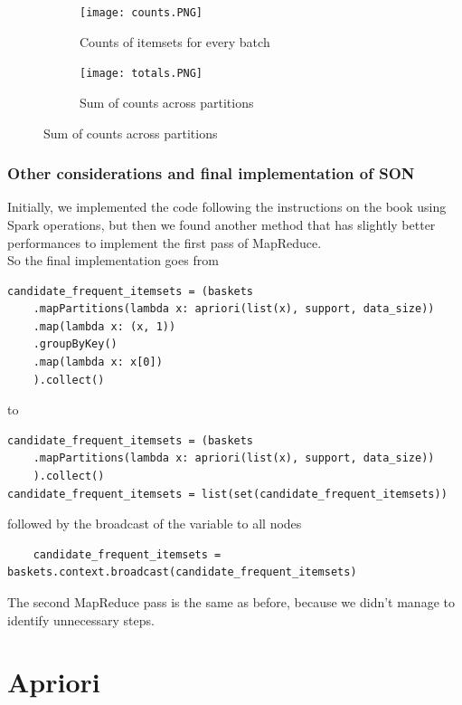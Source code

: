 \documentclass[a4paper]{article}
\begin{document}
	\begin{figure}[h]
		\centering
		
		\begin{subfigure}[b]{0.4\textwidth}
			\centering
			\texttt{[image: counts.PNG]}
         	\caption{Counts of itemsets for every batch}
         	\label{fig:counts}
		\end{subfigure}
		\hfill
		\begin{subfigure}[b]{0.4\textwidth}
			\centering
			\texttt{[image: totals.PNG]}
         	\caption{Sum of counts across partitions}
         	\label{fig:totals}
		\end{subfigure}
	\end{figure}
	
	
	\subsubsection{Other considerations and final implementation of SON}
	Initially, we implemented the code following the instructions on the book using Spark operations, but then we found another method that has slightly better performances to implement the first
	pass of MapReduce.\\
	So the final implementation goes from
	\begin{lstlisting}
candidate_frequent_itemsets = (baskets
    .mapPartitions(lambda x: apriori(list(x), support, data_size))
    .map(lambda x: (x, 1))                                             
    .groupByKey()                                                      
    .map(lambda x: x[0])                                               
    ).collect()
\end{lstlisting}
to
	\begin{lstlisting}
candidate_frequent_itemsets = (baskets
    .mapPartitions(lambda x: apriori(list(x), support, data_size))
    ).collect()
candidate_frequent_itemsets = list(set(candidate_frequent_itemsets))
\end{lstlisting}
followed by the broadcast of the variable to all nodes
\begin{lstlisting}
	candidate_frequent_itemsets = baskets.context.broadcast(candidate_frequent_itemsets)
	\end{lstlisting}
	
	The second MapReduce pass is the same as before, because we didn't manage to identify unnecessary steps.

	\newpage
	
	\section{Apriori}
	\label{section:apriori}
	
\end{document}
